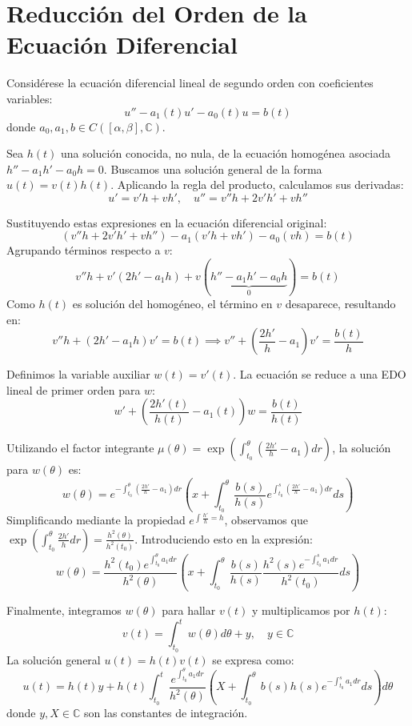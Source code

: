 \section*{Reducción del Orden de la Ecuación Diferencial}

Considérese la ecuación diferencial lineal de segundo orden con coeficientes variables:
\[
    u'' - a_1(t) u' - a_0(t) u = b(t) \label{eq:edo_reduccion}
\]
donde $a_0, a_1, b \in C([\alpha, \beta], \mathbb{C})$. 

Sea $h(t)$ una solución conocida, no nula, de la ecuación homogénea asociada $h'' - a_1 h' - a_0 h = 0$. Buscamos una solución general de la forma $u(t) = v(t)h(t)$. Aplicando la regla del producto, calculamos sus derivadas:
\[
    u' = v'h + vh', \quad u'' = v''h + 2v'h' + vh''
\]

Sustituyendo estas expresiones en la ecuación diferencial original:
\[
    (v''h + 2v'h' + vh'') - a_1(v'h + vh') - a_0(vh) = b(t)
\]
Agrupando términos respecto a $v$:
\[
    v''h + v'(2h' - a_1h) + v(\underbrace{h'' - a_1h' - a_0h}_{0}) = b(t)
\]
Como $h(t)$ es solución del homogéneo, el término en $v$ desaparece, resultando en:
\[
    v''h + (2h' - a_1h)v' = b(t) \implies v'' + \left( \frac{2h'}{h} - a_1 \right)v' = \frac{b(t)}{h}
\]

Definimos la variable auxiliar $w(t) = v'(t)$. La ecuación se reduce a una EDO lineal de primer orden para $w$:
\[
    w' + \left( \frac{2h'(t)}{h(t)} - a_1(t) \right)w = \frac{b(t)}{h(t)} 
\]

Utilizando el factor integrante $\mu(\theta) = \exp\left( \int_{t_0}^{\theta} \left( \frac{2h'}{h} - a_1 \right) dr \right)$, la solución para $w(\theta)$ es:
\[
    w(\theta) = e^{-\int_{t_0}^{\theta} \left( \frac{2h'}{h} - a_1 \right) dr} \left( x + \int_{t_0}^{\theta} \frac{b(s)}{h(s)} e^{\int_{t_0}^{s} \left( \frac{2h'}{h} - a_1 \right) dr} ds \right)
\]
Simplificando mediante la propiedad $e^{\int \frac{h'}{h} = h}$, observamos que $\exp(\int_{t_0}^{\theta} \frac{2h'}{h} dr) = \frac{h^2(\theta)}{h^2(t_0)}$. Introduciendo esto en la expresión:
\[
    w(\theta) = \frac{h^2(t_0) e^{\int_{t_0}^{\theta} a_1 dr}}{h^2(\theta)} \left( x + \int_{t_0}^{\theta} \frac{b(s)}{h(s)} \frac{h^2(s) e^{-\int_{t_0}^{s} a_1 dr}}{h^2(t_0)} ds \right)
\]

Finalmente, integramos $w(\theta)$ para hallar $v(t)$ y multiplicamos por $h(t)$:
\[
    v(t) = \int_{t_0}^{t} w(\theta) d\theta + y, \quad y \in \mathbb{C}
\]
La solución general $u(t) = h(t)v(t)$ se expresa como:
\[
    u(t) = h(t)y + h(t) \int_{t_0}^{t} \frac{e^{\int_{t_0}^{\theta} a_1 dr}}{h^2(\theta)} \left( X + \int_{t_0}^{\theta} b(s)h(s)e^{-\int_{t_0}^{s} a_1 dr} ds \right) d\theta
\]
donde $y, X \in \mathbb{C}$ son las constantes de integración.

